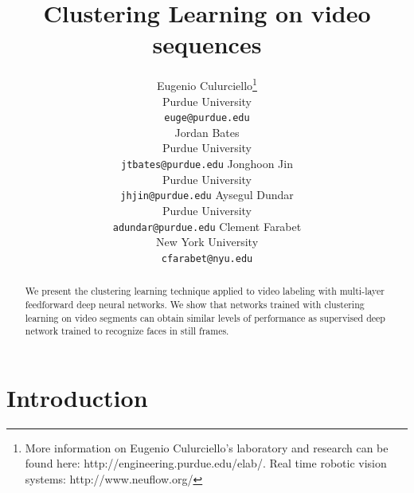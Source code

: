 \documentclass{article} %
\begin{document}
\title{Clustering Learning on video sequences}

\author{
Eugenio Culurciello\thanks{More information on Eugenio Culurciello's laboratory and research can be found here: http://engineering.purdue.edu/elab/. Real time robotic vision systems: http://www.neuflow.org/} \\
Purdue University\\
\texttt{euge@purdue.edu} \\
\And
Jordan Bates \\
Purdue University\\
\texttt{jtbates@purdue.edu}
\AND
Jonghoon Jin \\
Purdue University\\
\texttt{jhjin@purdue.edu}
\AND
Aysegul Dundar \\
Purdue University\\
\texttt{adundar@purdue.edu}
\And
Clement Farabet \\
New York University \\
\texttt{cfarabet@nyu.edu}
}


\maketitle

\begin{abstract}
We present the clustering learning technique applied to video labeling with multi-layer feedforward deep neural networks. We show that networks trained with clustering learning on video segments can obtain similar levels of performance as supervised deep network trained to recognize faces in still frames. 
\end{abstract}


\section{Introduction}
\end{document}
